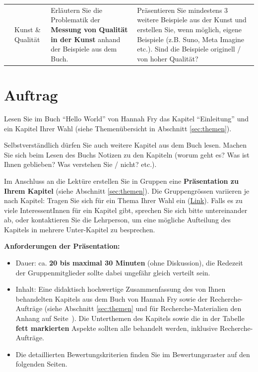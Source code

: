 \begin{landscape}
\begin{longtable}{@{}rp{5.3cm}p{9.5cm}p{9.5cm}@{}}
		                              & Kunst \& Qualität                     & Erläutern Sie die Problematik der \textbf{Messung von Qualität in der Kunst} anhand der Beispiele aus dem Buch.                                                                                                                                                                                                                                                                      & Präsentieren Sie mindestens 3 weitere Beispiele aus der Kunst und erstellen Sie, wenn möglich, eigene Beispiele (z.B. Suno, Meta Imagine etc.). Sind die Beispiele originell / von hoher Qualität?                                                                               \\
	\end{longtable}

\end{landscape}


\restoregeometry
\pagestyle{fancy}
\newpage
\section{Auftrag}
Lesen Sie im Buch \enquote{Hello World} von Hannah Fry das Kapitel \enquote{Einleitung} und ein Kapitel Ihrer Wahl (siehe Themenübersicht in Abschnitt \ref{sec:themen}).

Selbstverständlich dürfen Sie auch weitere Kapitel aus dem Buch lesen. Machen Sie sich beim Lesen des Buchs Notizen zu den Kapiteln (worum geht es? Was ist Ihnen geblieben? Was verstehen Sie / nicht? etc.).

Im Anschluss an die Lektüre erstellen Sie in Gruppen eine \textbf{Präsentation zu Ihrem Kapitel} (siehe Abschnitt \ref{sec:themen}). Die Gruppengrössen variieren je nach Kapitel: Tragen Sie sich für ein Thema Ihrer Wahl ein (\href{https://eduzh-my.sharepoint.com/:x:/g/personal/cyril_wendl_edu_zh_ch/EScHfDarDeVHhAJB3WPCghsBYa63XpdaEkcrZk5dOiQiVA?e=kHy0bM}{Link}). Falls es zu viele InteressentInnen für ein Kapitel gibt, sprechen Sie sich bitte untereinander ab, oder kontaktieren Sie die Lehrperson, um eine mögliche Aufteilung des Kapitels in mehrere Unter-Kapitel zu besprechen.

\textbf{Anforderungen der Präsentation:}
\begin{itemize}
	\item Dauer: ca. \textbf{20 bis maximal 30 Minuten} (ohne Diskussion), die Redezeit der Gruppenmitglieder sollte dabei ungefähr gleich verteilt sein.
	\item Inhalt: Eine didaktisch hochwertige Zusammenfassung des von Ihnen behandelten Kapitels aus dem Buch von Hannah Fry sowie der Recherche-Aufträge (siehe Abschnitt \ref{sec:themen} und für Recherche-Materialien den Anhang auf Seite~\pageref{sec:materialien}). Die Unterthemen des Kapitels sowie die in der Tabelle \textbf{fett markierten} Aspekte sollten alle behandelt werden, inklusive Recherche-Aufträge.
	\item Die detaillierten Bewertungskriterien finden Sie im Bewertungsraster auf den folgenden Seiten.
\end{itemize}

